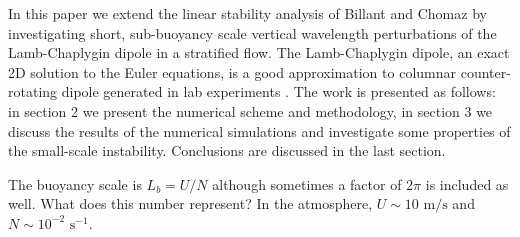 In this paper we extend the linear stability analysis of Billant and Chomaz\cite{bc2000c} by investigating short, sub-buoyancy scale vertical wavelength perturbations of the Lamb-Chaplygin dipole in a stratified flow. The Lamb-Chaplygin dipole, an exact 2D solution to the Euler equations, is a good approximation to columnar counter-rotating dipole generated in lab experiments \cite{bc2000a}.  The work is presented as follows: in section 2 we present the numerical scheme and methodology, in section 3 we discuss the results of the numerical simulations and investigate some properties of the small-scale instability. Conclusions are discussed in the last section. 

The buoyancy scale is $L_{b}=U/N$ although sometimes a factor of $2\pi$ is included as well. What does this number represent? In the atmosphere, $U\sim 10 \text{ m/s}$ and $N\sim 10^{-2} \text{ s}^{-1}$. 
